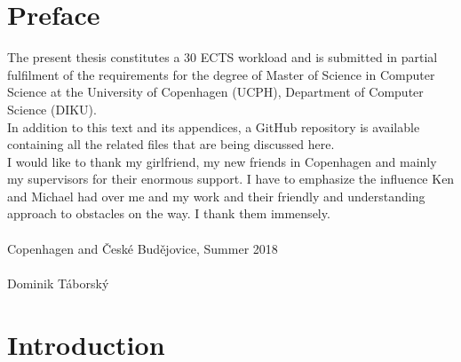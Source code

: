 \documentclass[a4paper,10pt,openright]{memoir}
\begin{document}
\cleardoublepage
{}
\tableofcontents*


\cleardoublepage
{}
\setcounter{page}{1}


%
\chapter*{Preface}

The present thesis constitutes a 30 ECTS workload and is submitted in 
partial fulfilment of the requirements for the degree of Master of 
Science in Computer Science at the University of Copenhagen (UCPH), 
Department of Computer Science (DIKU).\\

In addition to this text and its appendices, a GitHub repository is 
available\cite{revcry-github} containing all the related files that are 
being discussed here.\\

I would like to thank my girlfriend, my new friends in Copenhagen and 
mainly my supervisors for their enormous support. I have to emphasize 
the influence Ken and Michael had over me and my work and their 
friendly and understanding approach to obstacles on the way. I thank 
them immensely.\\
\\
Copenhagen and \v{C}esk\'{e} Bud\v{e}jovice, Summer 2018\\
\\
Dominik T\'{a}borsk\'{y}


\cleardoublepage



\cleardoublepage

\chapter{Introduction}
\end{document}
